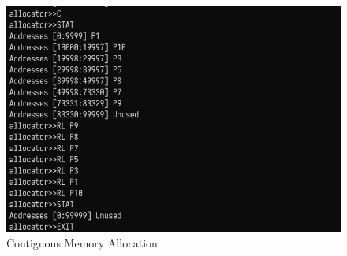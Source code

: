 \documentclass[UTF8,10pt,a4paper]{article}
\theoremstyle{Problem}
\theoremstyle{Solution}
\begin{document}
\begin{figure}[H]
    \centering
    \includegraphics[width=400pt]{3.png}
    \caption{Contiguous Memory Allocation}
    \label{3}
\end{figure}
\end{document}
